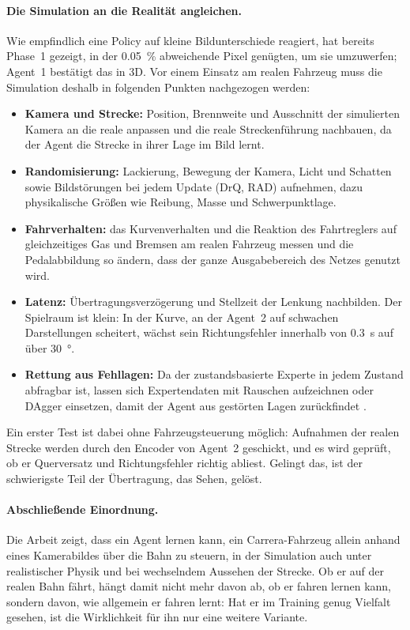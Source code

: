 \paragraph{Die Simulation an die Realität angleichen.}
Wie empfindlich eine Policy auf kleine Bildunterschiede reagiert, hat bereits Phase~1 gezeigt, in der \SI{0.05}{\percent} abweichende Pixel genügten, um sie umzuwerfen; Agent~1 bestätigt das in 3D. Vor einem Einsatz am realen Fahrzeug muss die Simulation deshalb in folgenden Punkten nachgezogen werden:

\begin{itemize}
  \item \textbf{Kamera und Strecke:} Position, Brennweite und Ausschnitt der simulierten Kamera an die reale anpassen und die reale Streckenführung nachbauen, da der Agent die Strecke in ihrer Lage im Bild lernt.
  \item \textbf{Randomisierung:} Lackierung, Bewegung der Kamera, Licht und Schatten sowie Bildstörungen bei jedem Update (DrQ, RAD) aufnehmen, dazu physikalische Größen wie Reibung, Masse und Schwerpunktlage.
  \item \textbf{Fahrverhalten:} das Kurvenverhalten und die Reaktion des Fahrtreglers auf gleichzeitiges Gas und Bremsen am realen Fahrzeug messen und die Pedalabbildung so ändern, dass der ganze Ausgabebereich des Netzes genutzt wird.
  \item \textbf{Latenz:} Übertragungsverzögerung und Stellzeit der Lenkung nachbilden. Der Spielraum ist klein: In der Kurve, an der Agent~2 auf schwachen Darstellungen scheitert, wächst sein Richtungsfehler innerhalb von \SI{0.3}{\second} auf über \SI{30}{\degree}.
  \item \textbf{Rettung aus Fehllagen:} Da der zustandsbasierte Experte in jedem Zustand abfragbar ist, lassen sich Expertendaten mit Rauschen aufzeichnen oder DAgger \cite{ross2011reduction} einsetzen, damit der Agent aus gestörten Lagen zurückfindet \cite{amini2020learning}.
\end{itemize}

Ein erster Test ist dabei ohne Fahrzeugsteuerung möglich: Aufnahmen der realen Strecke werden durch den Encoder von Agent~2 geschickt, und es wird geprüft, ob er Querversatz und Richtungsfehler richtig abliest. Gelingt das, ist der schwierigste Teil der Übertragung, das Sehen, gelöst.

\paragraph{Abschließende Einordnung.}
Die Arbeit zeigt, dass ein Agent lernen kann, ein Carrera-Fahrzeug allein anhand eines Kamerabildes über die Bahn zu steuern, in der Simulation auch unter realistischer Physik und bei wechselndem Aussehen der Strecke. Ob er auf der realen Bahn fährt, hängt damit nicht mehr davon ab, ob er fahren lernen kann, sondern davon, wie allgemein er fahren lernt: Hat er im Training genug Vielfalt gesehen, ist die Wirklichkeit für ihn nur eine weitere Variante.
